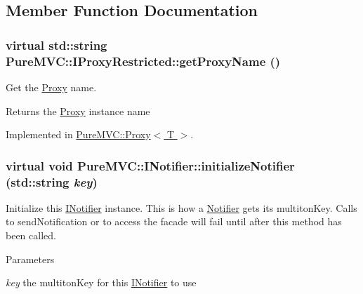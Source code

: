 \subsection{Member Function Documentation}
\hypertarget{class_pure_m_v_c_1_1_i_proxy_restricted_ae52c8f9de4c2f4a4b90e97006e0b08f9}{
\subsubsection[{getProxyName}]{\setlength{\rightskip}{0pt plus 5cm}virtual std::string PureMVC::IProxyRestricted::getProxyName ()}}
\label{class_pure_m_v_c_1_1_i_proxy_restricted_ae52c8f9de4c2f4a4b90e97006e0b08f9}


Get the \hyperlink{class_pure_m_v_c_1_1_proxy}{Proxy} name. \begin{DoxyReturn}{Returns}
the \hyperlink{class_pure_m_v_c_1_1_proxy}{Proxy} instance name 
\end{DoxyReturn}


Implemented in \hyperlink{class_pure_m_v_c_1_1_proxy_a1aad6dd9244cd07361afb0bb5829b09d}{PureMVC::Proxy$<$ T $>$}.\hypertarget{class_pure_m_v_c_1_1_i_notifier_a28d7dbbe0726d4d52080546c5d79b232}{
\subsubsection[{initializeNotifier}]{\setlength{\rightskip}{0pt plus 5cm}virtual void PureMVC::INotifier::initializeNotifier (std::string {\em key})}}
\label{class_pure_m_v_c_1_1_i_notifier_a28d7dbbe0726d4d52080546c5d79b232}


Initialize this \hyperlink{class_pure_m_v_c_1_1_i_notifier}{INotifier} instance. This is how a \hyperlink{class_pure_m_v_c_1_1_notifier}{Notifier} gets its multitonKey. Calls to sendNotification or to access the facade will fail until after this method has been called.


\begin{DoxyParams}{Parameters}
\item[{\em key}]the multitonKey for this \hyperlink{class_pure_m_v_c_1_1_i_notifier}{INotifier} to use \end{DoxyParams}



